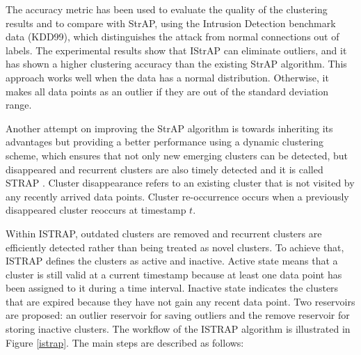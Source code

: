 
The accuracy metric has been used to evaluate the quality of the clustering results and to compare with StrAP, using the Intrusion Detection benchmark data (KDD99), which distinguishes the attack from normal connections out of labels.   
The experimental results show that IStrAP can eliminate outliers, and it has shown a higher clustering accuracy than the existing StrAP algorithm. 
This approach works well when the data has a normal distribution. Otherwise, it makes all data points as an outlier if they are out of the standard deviation range.



Another attempt on improving the StrAP algorithm is towards inheriting its advantages but providing a better performance using a dynamic clustering scheme, which ensures that not only new emerging clusters can be detected, but disappeared and recurrent clusters are also timely detected and it is called STRAP \cite{sui2018dynamic}. Cluster disappearance refers to an existing cluster that is not visited by any recently arrived data points. Cluster re-occurrence occurs when a previously disappeared cluster reoccurs at timestamp $t$. 

Within ISTRAP, outdated clusters are removed and recurrent clusters are efficiently detected rather than being treated as novel clusters. To achieve that, ISTRAP defines the clusters as active and inactive. Active state means that a cluster is still valid at a current timestamp because at least one data point has been assigned to it during a time interval. Inactive state indicates the clusters that are expired because they have not gain any recent data point. Two reservoirs are proposed: an outlier reservoir for saving outliers and the remove reservoir for storing inactive clusters. The workflow of the ISTRAP algorithm is illustrated in Figure \ref{istrap}. The main steps are described as follows:

